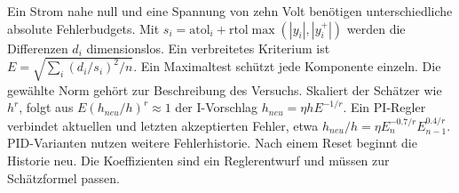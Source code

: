\hypertarget{punkt2-3-1}{}
Ein Strom nahe null und eine Spannung von zehn Volt benötigen unterschiedliche absolute Fehlerbudgets. Mit \(s_i=\mathrm{atol}_i+\mathrm{rtol}\max(|y_i|,|y_i^+|)\) werden die Differenzen \(d_i\) dimensionslos. Ein verbreitetes Kriterium ist \(E=\sqrt{\sum_i(d_i/s_i)^2/n}\). Ein Maximaltest schützt jede Komponente einzeln. Die gewählte Norm gehört zur Beschreibung des Versuchs.
\hypertarget{punkt2-3-2}{}
Skaliert der Schätzer wie \(h^r\), folgt aus \(E(h_{neu}/h)^r\approx1\) der I-Vorschlag \(h_{neu}=\eta h E^{-1/r}\). Ein PI-Regler verbindet aktuellen und letzten akzeptierten Fehler, etwa \(h_{neu}/h=\eta E_n^{-0.7/r}E_{n-1}^{0.4/r}\). PID-Varianten nutzen weitere Fehlerhistorie. Nach einem Reset beginnt die Historie neu. Die Koeffizienten sind ein Reglerentwurf und müssen zur Schätzformel passen.

